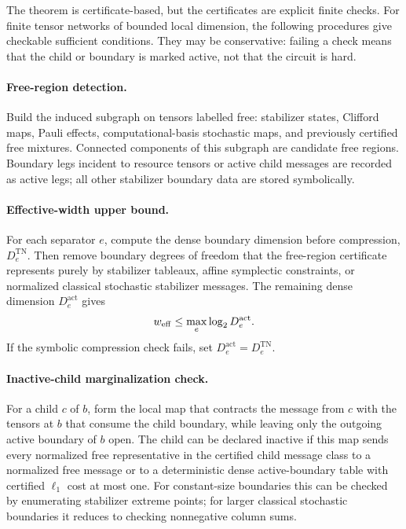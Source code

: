 The theorem is certificate-based, but the certificates are explicit finite checks. For finite tensor networks of bounded local dimension, the following procedures give checkable sufficient conditions. They may be conservative: failing a check means that the child or boundary is marked active, not that the circuit is hard.

\paragraph{Free-region detection.}
Build the induced subgraph on tensors labelled free: stabilizer states, Clifford maps, Pauli effects, computational-basis stochastic maps, and previously certified free mixtures. Connected components of this subgraph are candidate free regions. Boundary legs incident to resource tensors or active child messages are recorded as active legs; all other stabilizer boundary data are stored symbolically.

\paragraph{Effective-width upper bound.}
For each separator \(e\), compute the dense boundary dimension before compression, \(D_e^{\mathrm{TN}}\). Then remove boundary degrees of freedom that the free-region certificate represents purely by stabilizer tableaux, affine symplectic constraints, or normalized classical stochastic stabilizer messages. The remaining dense dimension \(D_e^{\mathrm{act}}\) gives
\[
w_{\mathrm{eff}}\le \max_e \log_2 D_e^{\mathrm{act}}.
\]
If the symbolic compression check fails, set \(D_e^{\mathrm{act}}=D_e^{\mathrm{TN}}\).

\paragraph{Inactive-child marginalization check.}
For a child \(c\) of \(b\), form the local map that contracts the message from \(c\) with the tensors at \(b\) that consume the child boundary, while leaving only the outgoing active boundary of \(b\) open. The child can be declared inactive if this map sends every normalized free representative in the certified child message class to a normalized free message or to a deterministic dense active-boundary table with certified \(\ell_1\) cost at most one. For constant-size boundaries this can be checked by enumerating stabilizer extreme points; for larger classical stochastic boundaries it reduces to checking nonnegative column sums.

